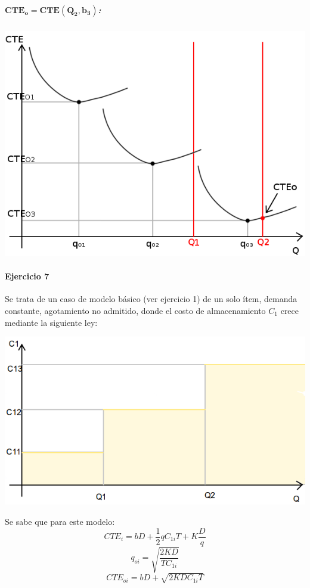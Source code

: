 \documentclass[a4paper,10pt]{article}
\begin{document}
	\subparagraph{$\mathbf{CTE_o = CTE(Q_2, b_3)}$:}
	\begin{center}
	\includegraphics[scale=0.4,keepaspectratio=true]{img/6/6_CTE1_vs_Q2.png} 
	\end{center}

\paragraph{Ejercicio 7}
Se trata de un caso de modelo básico (ver ejercicio 1) de un solo ítem, demanda constante, agotamiento no admitido, donde el costo de almacenamiento $C_{1}$ crece mediante la siguiente ley:
\begin{center}
  \includegraphics[scale=0.4,keepaspectratio=true]{img/7/7_QvsC1.png} 
\end{center}
Se sabe que para este modelo:
  \begin{equation}\label{7_CTE}CTE_i = bD + \frac{1}{2}qC_{1i}T + K\frac{D}{q} \end{equation}
  $$ q_{oi} = \sqrt{ \frac{2KD}{TC_{1i}}} $$
  $$ CTE_{oi} = bD + \sqrt{ 2KDC_{1i}T }$$
\end{document}
